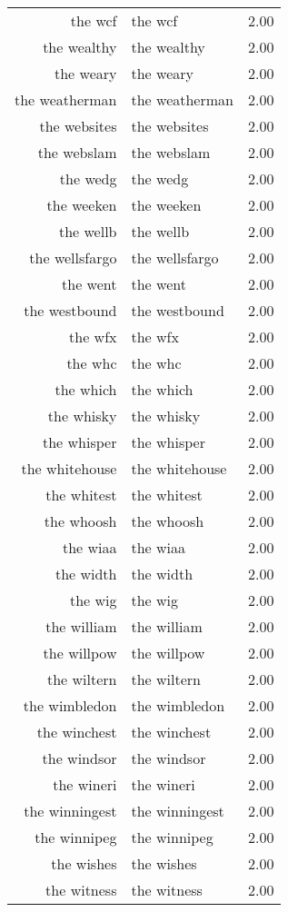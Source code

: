 \begin{table}[ht]
\begin{tabular}{rlr}
  the wcf & the wcf & 2.00 \\ 
  the wealthy & the wealthy & 2.00 \\ 
  the weary & the weary & 2.00 \\ 
  the weatherman & the weatherman & 2.00 \\ 
  the websites & the websites & 2.00 \\ 
  the webslam & the webslam & 2.00 \\ 
  the wedg & the wedg & 2.00 \\ 
  the weeken & the weeken & 2.00 \\ 
  the wellb & the wellb & 2.00 \\ 
  the wellsfargo & the wellsfargo & 2.00 \\ 
  the went & the went & 2.00 \\ 
  the westbound & the westbound & 2.00 \\ 
  the wfx & the wfx & 2.00 \\ 
  the whc & the whc & 2.00 \\ 
  the which & the which & 2.00 \\ 
  the whisky & the whisky & 2.00 \\ 
  the whisper & the whisper & 2.00 \\ 
  the whitehouse & the whitehouse & 2.00 \\ 
  the whitest & the whitest & 2.00 \\ 
  the whoosh & the whoosh & 2.00 \\ 
  the wiaa & the wiaa & 2.00 \\ 
  the width & the width & 2.00 \\ 
  the wig & the wig & 2.00 \\ 
  the william & the william & 2.00 \\ 
  the willpow & the willpow & 2.00 \\ 
  the wiltern & the wiltern & 2.00 \\ 
  the wimbledon & the wimbledon & 2.00 \\ 
  the winchest & the winchest & 2.00 \\ 
  the windsor & the windsor & 2.00 \\ 
  the wineri & the wineri & 2.00 \\ 
  the winningest & the winningest & 2.00 \\ 
  the winnipeg & the winnipeg & 2.00 \\ 
  the wishes & the wishes & 2.00 \\ 
  the witness & the witness & 2.00 \\ 

\end{tabular}
\end{table}
